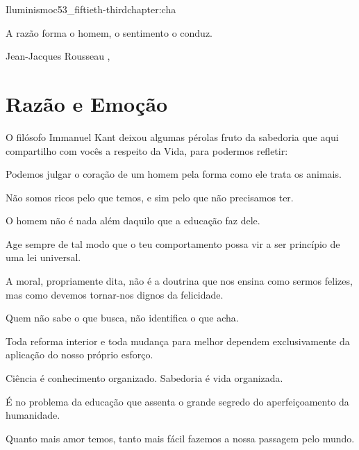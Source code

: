 \begin{chapterpage}{Iluminismo}{c53_fiftieth-thirdchapter:cha}
 
\begin{myquotation}A razão forma o homem, o sentimento o conduz.
\par\vspace*{15mm}
\mbox{}\hfill \emdash{}Jean-Jacques Rousseau
, %
\par\end{myquotation}

\end{chapterpage}



\section{Razão e Emoção}\label{c1_basicformatting:sec}

\emdash{}O filósofo Immanuel Kant deixou algumas pérolas fruto da sabedoria que aqui compartilho com vocês a respeito da Vida, para podermos refletir:

\emdash{}Podemos julgar o coração de um homem pela forma como ele trata os animais.

\emdash{}Não somos ricos pelo que temos, e sim pelo que não precisamos ter.

\emdash{}O homem não é nada além daquilo que a educação faz dele.

\emdash{}Age sempre de tal modo que o teu comportamento possa vir a ser princípio de uma lei universal.

\emdash{}A moral, propriamente dita, não é a doutrina que nos ensina como sermos felizes, mas como devemos tornar-nos dignos da felicidade.

\emdash{}Quem não sabe o que busca, não identifica o que acha.

\emdash{}Toda reforma interior e toda mudança para melhor dependem exclusivamente da aplicação do nosso próprio esforço.

\emdash{}Ciência é conhecimento organizado. Sabedoria é vida organizada.

\emdash{}É no problema da educação que assenta o grande segredo do aperfeiçoamento da humanidade.

\emdash{}Quanto mais amor temos, tanto mais fácil fazemos a nossa passagem pelo mundo.

